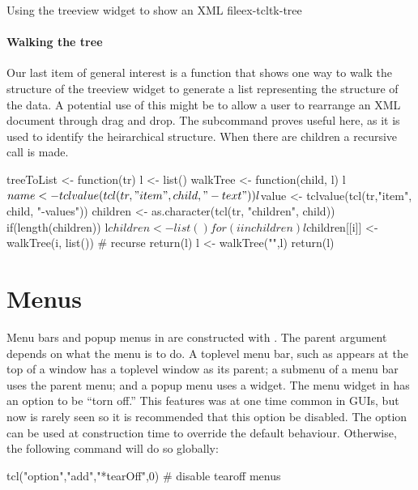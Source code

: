 \begin{example}{Using the treeview widget to show an XML file}{ex-tcltk-tree}
\paragraph{Walking the tree}
Our last item of general interest is a function that shows one way to
walk the structure of the treeview widget to generate a list
representing the structure of the data.  A potential use of this might
be to allow a user to rearrange an XML document through drag and drop.
The subcommand  proves useful here,
as it is used to identify the heirarchical structure. When there are children a recursive call is made.



\begin{Schunk}
\begin{Sinput}
 treeToList <- function(tr) {
   l <- list()
   walkTree <- function(child, l) {
     l$name <- tclvalue(tcl(tr,"item", child, "-text"))
     l$value <- tclvalue(tcl(tr,"item", child, "-values"))
     children <- as.character(tcl(tr, "children", child)) 
     if(length(children)) {
       l$children <- list()
       for(i in children) 
         l$children[[i]] <- walkTree(i, list()) # recurse
     }
     return(l)
   }
   l <- walkTree("",l)
   return(l)
 }
\end{Sinput}
\end{Schunk}
\end{example}



\section{Menus}
\label{sec:tcltk:menus}

Menu bars and popup menus in \Tk\/ are constructed with . The 
parent argument depends on what the menu is to do. A toplevel menu bar, such as appears at the top of a window has a toplevel window as its parent; a submenu of a menu bar  uses the parent menu; and a popup menu uses a widget.
The menu widget in \Tk\/ has an option to be ``torn off.'' This features was at one time common in GUIs, but now is rarely seen so it is recommended that this option be disabled. The  option can be used at
construction time to override the default behaviour. Otherwise, the following command will do so globally:
\begin{Schunk}
\begin{Sinput}
 tcl("option","add","*tearOff",0)       # disable tearoff menus
\end{Sinput}
\end{Schunk}

